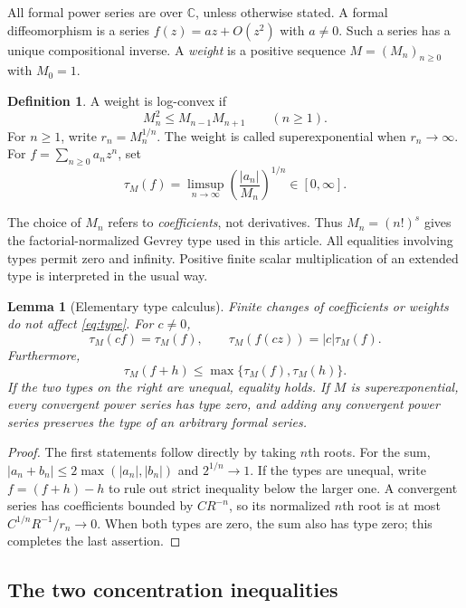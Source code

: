 \documentclass[11pt,a4paper]{article}
\numberwithin{equation}{section}
\newtheorem{lemma}[theorem]{Lemma}
\theoremstyle{definition}
\newtheorem{definition}[theorem]{Definition}
\theoremstyle{remark}
\newcommand{\C}{\mathbb C}
\newcommand{\typ}{\tau_M}
\begin{document}
All formal power series are over $\C$, unless otherwise stated. A formal
diffeomorphism is a series $f(z)=a z+O(z^2)$ with $a\ne0$. Such a series
has a unique compositional inverse. A \emph{weight} is a positive sequence
$M=(M_n)_{n\ge0}$ with $M_0=1$.

\begin{definition}
A weight is log-convex if
\begin{equation}
 M_n^2\le M_{n-1}M_{n+1}\qquad(n\ge1).
 \label{eq:logconvex}
\end{equation}
For $n\ge1$, write $r_n=M_n^{1/n}$. The weight is called
superexponential when $r_n\to\infty$.
For $f=\sum_{n\ge0}a_nz^n$, set
\begin{equation}
 \typ(f)=\limsup_{n\to\infty}
       \left(\frac{|a_n|}{M_n}\right)^{1/n}\in[0,\infty].
 \label{eq:type}
\end{equation}
\end{definition}

The choice of $M_n$ refers to \emph{coefficients}, not derivatives. Thus
$M_n=(n!)^s$ gives the factorial-normalized Gevrey type used in this
article. All equalities involving types permit zero and infinity. Positive
finite scalar multiplication of an extended type is interpreted in the
usual way.

\begin{lemma}[Elementary type calculus]
\label{lem:typecalculus}
Finite changes of coefficients or weights do not affect \eqref{eq:type}.
For $c\ne0$,
\[
 \typ(cf)=\typ(f),\qquad \typ(f(cz))=|c|\typ(f).
\]
Furthermore,
\[
 \typ(f+h)\le\max\{\typ(f),\typ(h)\}.
\]
If the two types on the right are unequal, equality holds. If $M$ is
superexponential, every convergent power series has type zero, and adding
any convergent power series preserves the type of an arbitrary formal
series.
\end{lemma}
\begin{proof}
The first statements follow directly by taking $n$th roots. For the sum,
$|a_n+b_n|\le2\max(|a_n|,|b_n|)$ and $2^{1/n}\to1$. If the types are
unequal, write $f=(f+h)-h$ to rule out strict inequality below the larger
one. A convergent series has coefficients bounded by $CR^{-n}$, so its
normalized $n$th root is at most $C^{1/n}R^{-1}/r_n\to0$. When both types
are zero, the sum also has type zero; this completes the last assertion.
\end{proof}

\subsection{The two concentration inequalities}
\end{document}
